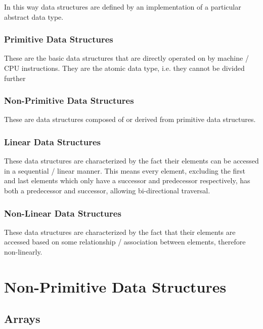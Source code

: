 \documentclass[12pt letter]{report}
\begin{document}
In this way data structures are defined by an implementation of a particular abstract data type.


\subsubsection{Primitive Data Structures}

These are the basic data structures that are directly operated on by machine / CPU instructions. They are the atomic
data type, i.e. they cannot be divided further

\subsubsection{Non-Primitive Data Structures}

These are data structures composed of or derived from primitive data structures.

\subsubsection{Linear Data Structures}

These data structures are characterized by the fact their elements can be accessed in a sequential / linear manner. This
means every element, excluding the first and last elements which only have a successor and predecessor respectively, has
both a predecessor and successor, allowing bi-directional traversal.

\subsubsection{Non-Linear Data Structures}

These data structures are characterized by the fact that their elements are accessed based on some relationship /
association between elements, therefore non-linearly.

\section{Non-Primitive Data Structures}

\subsection{Arrays}

\end{document}
